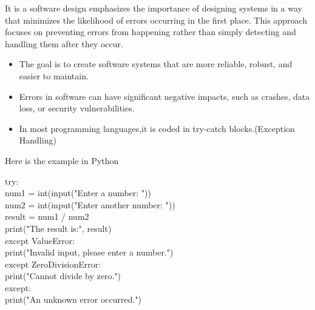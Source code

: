 %
%
%
%




\STANDARD{}
{ 
	
  It is a software design emphasizes the importance of designing systems in a way that minimizes the likelihood of errors occurring in the first place. This approach focuses on preventing errors from happening rather than simply detecting and handling them after they occur.\\
  
  \bigskip

  \begin{itemize}
    \item The goal is to create software systems that are more reliable, robust, and easier to maintain.
    \item Errors in software can have significant negative impacts, such as crashes, data loss, or security vulnerabilities.
    \item In most programming languages,it is coded in try-catch blocks.(Exception Handling)
  \end{itemize}
  
}
  	\begin{frame}
  		\vspace{0.5cm}
  		Here is the example in Python 
  		
  		\vspace{0.5cm}
  		
  		try:\\
  		num1 = int(input("Enter a number: "))\\
  		num2 = int(input("Enter another number: "))\\
  		result = num1 / num2\\
  		print("The result is:", result)\\
  		except ValueError:\\
  		print("Invalid input, please enter a number.")\\
  		except ZeroDivisionError:\\
  		print("Cannot divide by zero.")\\
  		except:\\
  		print("An unknown error occurred.")\\
  		
  	\end{frame}
